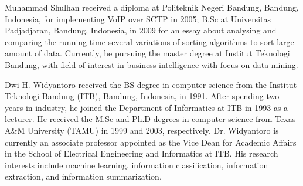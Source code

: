 \documentclass[conference,a4paper,twocolumn,final]{IEEEtran}
\begin{document}
\IEEEoverridecommandlockouts
\begin{IEEEbiographynophoto}{Muhammad Shulhan}
	received a diploma at Politeknik Negeri Bandung, Bandung, Indonesia, for
	implementing VoIP over SCTP in 2005; B.Sc at Universitas Padjadjaran,
	Bandung, Indonesia, in 2009 for an essay about analysing and comparing the
	running time several variations of sorting algorithms to sort large amount
	of data.
	Currently, he pursuing the master degree at Institut Teknologi Bandung, with
	field of interest in business intelligence with focus on data mining.
\end{IEEEbiographynophoto}

\newpage

\IEEEoverridecommandlockouts
\begin{IEEEbiographynophoto}{Dwi H. Widyantoro}
received the BS degree in computer science from the Institut Teknologi Bandung
(ITB), Bandung, Indonesia, in 1991.
After spending two years in industry, he joined the Department of Informatics at
ITB in 1993 as a lecturer.
He received the M.Sc and Ph.D degrees in computer science from Texas A\&M
University (TAMU) in 1999 and 2003, respectively.
Dr. Widyantoro is currently an associate professor appointed as the Vice Dean
for Academic Affairs in the School of Electrical Engineering and Informatics at
ITB.
His research interests include machine learning, information classification,
information extraction, and information summarization.
\end{IEEEbiographynophoto}
\end{document}
